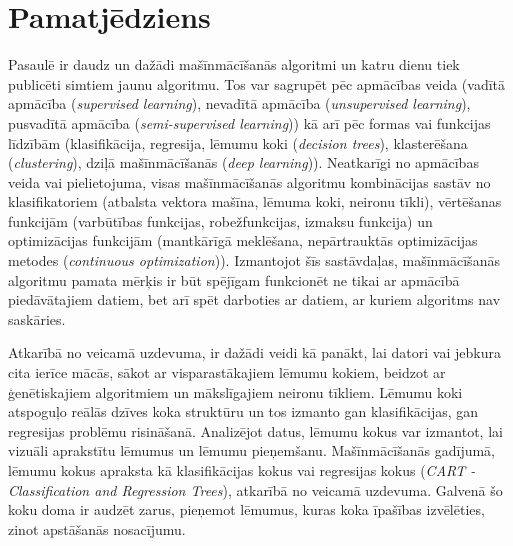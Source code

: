 \documentclass[12pt,paper=a4]{report}
\begin{document}
\section{Pamatjēdziens}
Pasaulē ir daudz un dažādi mašīnmācīšanās algoritmi un katru dienu tiek publicēti simtiem jaunu algoritmu. Tos var sagrupēt pēc apmācības veida (vadītā apmācība (\textit{supervised learning}), nevadītā apmācība (\textit{unsupervised learning}), pusvadītā apmācība (\textit{semi-supervised learning})) kā arī pēc formas vai funkcijas līdzībām (klasifikācija, regresija, lēmumu koki (\textit{decision trees}), klasterēšana (\textit{clustering}), dziļā mašīnmācīšanās (\textit{deep learning})). Neatkarīgi no apmācības veida vai pielietojuma, visas mašīnmācīšanās algoritmu kombinācijas sastāv no klasifikatoriem (atbalsta vektora mašīna, lēmuma koki, neironu tīkli), vērtēšanas funkcijām (varbūtības funkcijas, robežfunkcijas, izmaksu funkcija) un optimizācijas funkcijām (mantkārīgā meklēšana, nepārtrauktās optimizācijas metodes (\textit{continuous optimization})). Izmantojot šīs sastāvdaļas, mašīnmācīšanās algoritmu pamata mērķis ir būt spējīgam funkcionēt ne tikai ar apmācībā piedāvātajiem datiem, bet arī spēt darboties ar datiem, ar kuriem algoritms nav saskāries. 

Atkarībā no veicamā uzdevuma, ir dažādi veidi kā panākt, lai datori vai jebkura cita ierīce mācās, sākot ar visparastākajiem lēmumu kokiem, beidzot ar ģenētiskajiem algoritmiem un mākslīgajiem neironu tīkliem. Lēmumu koki atspoguļo reālās dzīves koka struktūru un tos izmanto gan klasifikācijas, gan regresijas problēmu risināšanā. Analizējot datus, lēmumu kokus var izmantot, lai vizuāli aprakstītu lēmumus un lēmumu pieņemšanu. Mašīnmācīšanās gadījumā, lēmumu kokus apraksta kā klasifikācijas kokus vai regresijas kokus (\textit{CART - Classification and Regression Trees}), atkarībā no veicamā uzdevuma. Galvenā šo koku doma ir audzēt zarus, pieņemot lēmumus, kuras koka īpašības izvēlēties, zinot apstāšanās nosacījumu. \cite{dectree}
\end{document}
